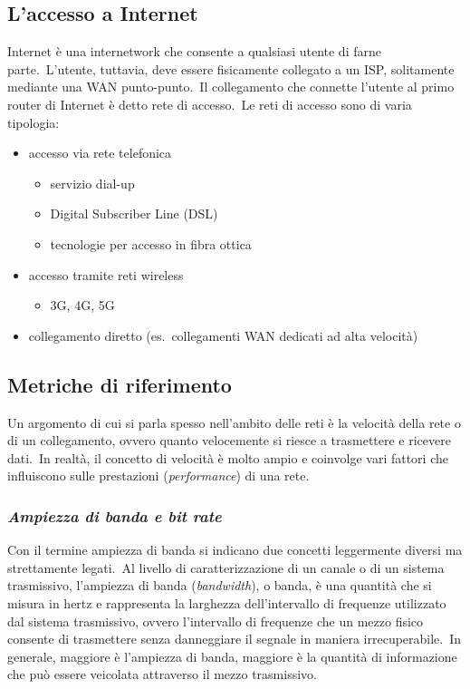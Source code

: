 \subsection{L'accesso a Internet}

Internet è una internetwork che consente a qualsiasi utente di farne parte.\
L'utente, tuttavia, deve essere fisicamente collegato a un ISP, solitamente mediante una WAN punto-punto.\
Il collegamento che connette l'utente al primo router di Internet è detto rete di accesso.\
Le reti di accesso sono di varia tipologia:\
\begin{itemize}
    \item accesso via rete telefonica
          \begin{itemize}
              \item servizio dial-up
              \item Digital Subscriber Line (DSL)
              \item tecnologie per accesso in fibra ottica
          \end{itemize}
    \item accesso tramite reti wireless
          \begin{itemize}
              \item 3G, 4G, 5G
          \end{itemize}
    \item collegamento diretto (es.\ collegamenti WAN dedicati ad alta velocità)
\end{itemize}

\subsection{Metriche di riferimento}

Un argomento di cui si parla spesso nell'ambito delle reti è la velocità della rete o di un collegamento, ovvero quanto velocemente si riesce a trasmettere e ricevere dati.\
In realtà, il concetto di velocità è molto ampio e coinvolge vari fattori che influiscono sulle prestazioni (\emph{performance}) di una rete.

\subsubsection{\emph{Ampiezza di banda e bit rate}}

Con il termine ampiezza di banda si indicano due concetti leggermente diversi ma strettamente legati.\
Al livello di caratterizzazione di un canale o di un sistema trasmissivo, l'ampiezza di banda (\emph{bandwidth}), o banda, è una quantità che si misura in hertz e rappresenta la larghezza dell'intervallo di frequenze utilizzato dal sistema trasmissivo, ovvero l'intervallo di frequenze che un mezzo fisico consente di trasmettere senza danneggiare il segnale in maniera irrecuperabile.\
In generale, maggiore è l'ampiezza di banda, maggiore è la quantità di informazione che può essere veicolata attraverso il mezzo trasmissivo.

